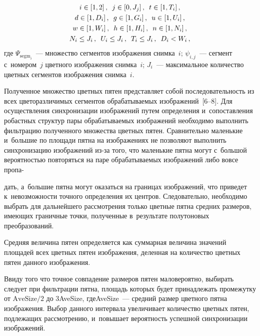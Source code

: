 \begin{multicols}{2}
  \vspace*{-12pt}
  
  \noindent
  \begin{gather*}
  i\in [1,  2]\,,\enskip
  j\in [0,  J_j]\,,\enskip
  t\in [1, T_i]\,,\\
  d\in [1, D_i]\,,\enskip
  g\in [1, G_i]\,,\enskip u\in [1, U_i]\,,\\
  w\in [1, W_i]\,,\enskip h\in [1, H_i]\,,\enskip
  n\in [1, N_i]\,,\\
  N_i\leq J_i\,,\enskip U_i\leq J_i\,, \enskip T_i\leq J_i\,,\enskip
  D_i<W_i\,,
  \end{gather*}
где $\Psi_{\mathrm{segm}_i}$~--- множество сегментов изоб\-ра\-же\-ния 
снимка~$i$;
$\psi_{i,j}$~--- сегмент с~номером~$j$ цветного изоб\-ра\-же\-ния снимка~$i$;
$J_i$~--- максимальное количество цветных сегментов изоб\-ра\-же\-ния 
снимка~$i$.
  
  Полученное множество цветных пятен представляет собой 
последовательность из всех цветоразличимых сегментов обрабатываемых 
изоб\-ра\-же\-ний~[6--8]. Для осуществления синхронизации 
изображений путем определения и~сопоставления робастных структур пары 
обрабатываемых изображений необходимо выполнить фильтрацию 
полученного множества цветных пятен. Сравнительно маленькие и~большие 
по площади пятна на изоб\-ра\-же\-ни\-ях не позволяют выполнить синхронизацию 
изображений из-за того, что маленькие пятна могут с~большой вероятностью 
повторяться на паре обрабатываемых изоб\-ра\-же\-ний либо вовсе пропа-\linebreak\vspace*{-12pt}

\pagebreak

\noindent
дать, 
а~большие пятна могут оказаться на границах изоб\-ра\-же\-ний, что приведет 
к~невозможности точного определения их центров. Следовательно, 
необходимо выбрать для дальнейшего рассмотрения только цветные пятна 
средних размеров, имеющих граничные точки, полученные в~результате 
полутоновых преобразований.
  
  Средняя величина пятен определяется как суммарная величина значений 
площадей всех цветных пятен изображения, деленная на количество цветных 
пятен данного изображения. 
  
  Ввиду того что точное совпадение размеров пятен маловероятно, выбирать 
следует при фильт\-ра\-ции пятна, площадь которых будет принадлежать 
промежутку от $\mathrm{AveSize}/2$ до 3AveSize, где\linebreak AveSize~--- средний 
размер цветного пятна изоб\-ра\-же\-ния. Выбор данного интервала увеличивает 
количество цветных пятен, подлежащих рассмотрению, и~повышает 
вероятность успешной синхронизации изображений.
  

\end{multicols}
